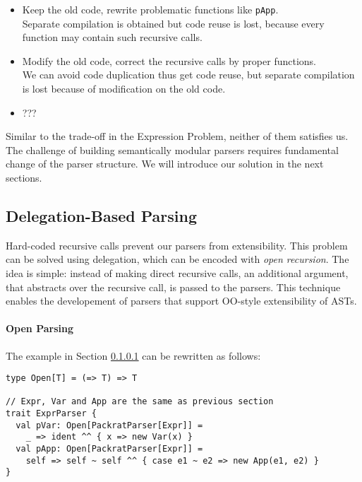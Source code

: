\begin{itemize}
    \item Keep the old code, rewrite problematic functions like \lstinline{pApp}. \\Separate compilation is obtained but code reuse is lost, because every function may contain such recursive calls.
    \item Modify the old code, correct the recursive calls by proper functions. \\We can avoid code duplication thus get code reuse, but separate compilation is lost because of modification on the old code.
    \item ??? 
\end{itemize}

Similar to the trade-off in the Expression Problem, neither of them satisfies us. The challenge of building semantically modular parsers requires fundamental change of the parser structure. We will introduce our solution in the next sections.

\subsection{Delegation-Based Parsing}\label{subsec:overview-firstlook}

Hard-coded recursive calls prevent our parsers from extensibility.
This problem can be solved using delegation, which can be encoded with \textit{open recursion}. The idea is
simple: instead of making direct recursive calls, an additional
argument, that abstracts over the recursive call, is passed to the
parsers. This technique enables the developement of parsers that
support OO-style extensibility of ASTs.

\paragraph{Open Parsing}
The example in Section \ref{} can be rewritten as follows:

\begin{lstlisting}
type Open[T] = (=> T) => T

// Expr, Var and App are the same as previous section
trait ExprParser {
  val pVar: Open[PackratParser[Expr]] =
    _ => ident ^^ { x => new Var(x) }
  val pApp: Open[PackratParser[Expr]] =
    self => self ~ self ^^ { case e1 ~ e2 => new App(e1, e2) }
}
\end{lstlisting}



